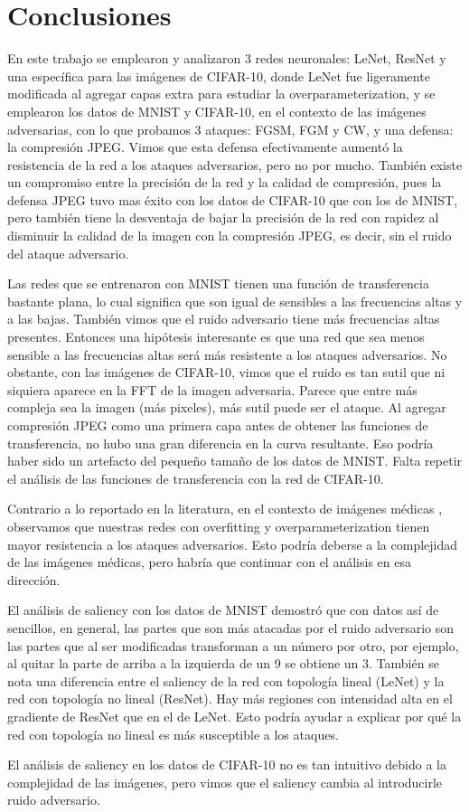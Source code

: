 \pagebreak

\section{Conclusiones}
En este trabajo se emplearon y analizaron 3 redes neuronales: LeNet, ResNet y una específica para las imágenes de CIFAR-10, donde LeNet fue ligeramente modificada al agregar capas extra para estudiar la overparameterization, y se emplearon los datos de MNIST y CIFAR-10, en el contexto de las imágenes adversarias, con lo que probamos 3 ataques: FGSM, FGM y CW, y una defensa: la compresión JPEG. Vimos que esta defensa efectivamente aumentó la resistencia de la red a los ataques adversarios, pero no por mucho. También existe un compromiso entre la precisión de la red y la calidad de compresión, pues la defensa JPEG tuvo mas éxito con los datos de CIFAR-10 que con los de MNIST, pero también tiene la desventaja de bajar la precisión de la red con rapidez al disminuir la calidad de la imagen con la compresión JPEG, es decir, sin el ruido del ataque adversario.

Las redes que se entrenaron con MNIST tienen una función de transferencia bastante plana, lo cual significa que son igual de sensibles a las frecuencias altas y a las bajas. También vimos que el ruido adversario tiene más frecuencias altas presentes. Entonces una hipótesis interesante es que una red que sea menos sensible a las frecuencias altas será más resistente a los ataques adversarios. No obstante, con las imágenes de CIFAR-10, vimos que el ruido es tan sutil que ni siquiera aparece en la FFT de la imagen adversaria. Parece que entre más compleja sea la imagen (más pixeles), más sutil puede ser el ataque. Al agregar compresión JPEG como una primera capa antes de obtener las funciones de transferencia, no hubo una gran diferencia en la curva resultante. Eso podría haber sido un artefacto del pequeño tamaño de los datos de MNIST. Falta repetir el análisis de las funciones de transferencia con la red de CIFAR-10.

Contrario a lo reportado en la literatura, en el contexto de imágenes médicas \cite{ma2020understanding}, observamos que nuestras redes con overfitting y overparameterization tienen mayor resistencia a los ataques adversarios. Esto podría deberse a la complejidad de las imágenes médicas, pero habría que continuar con el análisis en esa dirección.

El análisis de saliency con los datos de MNIST demostró que con datos así de sencillos, en general, las partes que son más atacadas por el ruido adversario son las partes que al ser modificadas transforman a un número por otro, por ejemplo, al quitar la parte de arriba a la izquierda de un 9 se obtiene un 3. También se nota una diferencia entre el saliency de la red con topología lineal (LeNet) y la red con topología no lineal (ResNet). Hay más regiones con intensidad alta en el gradiente de ResNet que en el de LeNet. Esto podría ayudar a explicar por qué la red con topología no lineal es más susceptible a los ataques.

El análisis de saliency en los datos de CIFAR-10 no es tan intuitivo debido a la complejidad de las imágenes, pero vimos que el saliency cambia al introducirle ruido adversario.